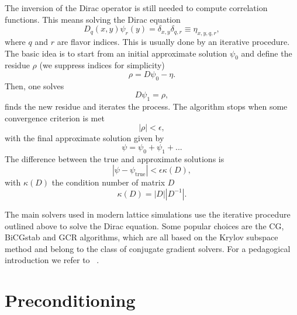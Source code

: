 The inversion of the Dirac operator is still needed to compute correlation functions. This means solving the Dirac equation
\begin{equation}
D_q(x,y)\psi_r(y)=\delta_{x,y}\delta_{q,r}\equiv\eta_{x,y,q,r},
\end{equation}
where $q$ and $r$ are flavor indices. This is usually done by an iterative procedure. The basic idea is to start from an initial approximate solution $\psi_0$ and define the residue $\rho$ (we suppress indices for simplicity)
\begin{equation}
\rho=D\psi_0-\eta.
\end{equation}
Then, one solves
\begin{equation}
D\psi_1=\rho,
\end{equation}
finds the new residue and iterates the process. The algorithm stops when some convergence criterion is met
\begin{equation}
|\rho|<\epsilon,
\end{equation}
with the final approximate solution given by
\begin{equation}
\psi=\psi_0+\psi_1+...
\end{equation}
The difference between the true and approximate solutions is
\begin{equation}
|\psi-\psi_{\textrm{true}}|<\epsilon\kappa(D),
\end{equation}
with $\kappa(D)$ the condition number of matrix $D$
\begin{equation}
\kappa(D)=|D||D^{-1}|.
\end{equation}

The main solvers used in modern lattice simulations use the iterative procedure outlined above to solve the Dirac equation. Some popular choices are the CG, BiCGstab and GCR algorithms, which are all based on the Krylov subspace method and belong to the class of conjugate gradient solvers. For a pedagogical introduction we refer to ~\citep{Gattringer_Lang_2010,Luscher:2010ae}.

\section{Preconditioning}

